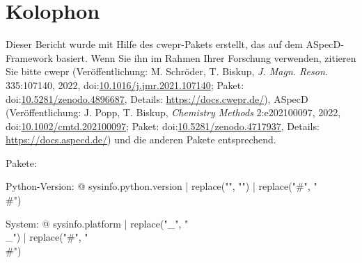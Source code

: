 \section*{Kolophon}

Dieser Bericht wurde mit Hilfe des cwepr-Pakets erstellt, das auf dem ASpecD-Framework basiert. Wenn Sie ihn im Rahmen Ihrer Forschung verwenden, zitieren Sie bitte cwepr (Veröffentlichung: M. Schröder, T. Biskup, \emph{J. Magn. Reson.} 335:107140, 2022, doi:\href{https://doi.org/10.1016/j.jmr.2021.107140}{10.1016/j.jmr.2021.107140}; Paket: doi:\href{https://doi.org/10.5281/zenodo.4896687}{10.5281/zenodo.4896687}, Details: \url{https://docs.cwepr.de/}), ASpecD (Veröffentlichung: J. Popp, T. Biskup, \emph{Chemistry Methods} 2:e202100097, 2022, doi:\href{https://doi.org/10.1002/cmtd.202100097}{10.1002/cmtd.202100097}; Paket: doi:\href{https://doi.org/10.5281/zenodo.4717937}{10.5281/zenodo.4717937}, Details: \url{https://docs.aspecd.de/}) und die anderen Pakete entsprechend.

Pakete: %


Python-Version: {@ sysinfo.python.version | replace("\n", "") | replace("#", "\\#") }

System: {@ sysinfo.platform | replace("_", "\\_") | replace("#", "\\#") }
